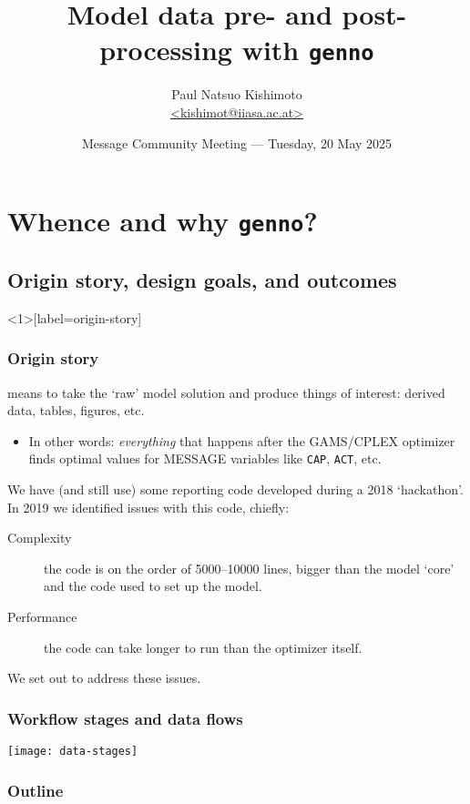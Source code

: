 \documentclass[12pt,aspectratio=169]{beamer}
\title{Model data pre- and post-processing with \texttt{genno}}
\date{
  \texorpdfstring{Message Community Meeting — Tuesday, 20 May 2025}%
  {2025-05-20}}
\author{\texorpdfstring{Paul Natsuo Kishimoto\\
  \href{mailto:kishimot@iiasa.ac.at}{\ttfamily \scriptsize <kishimot@iiasa.ac.at>}%
  }{Paul Natsuo Kishimoto <kishimot@iiasa.ac.at>}}
\begin{document}
\maketitle

\section{Whence and why \texttt{genno}?}

\subsection{Origin story, design goals, and outcomes}

\begin{frame}<1>[label=origin-story]
\frametitle{Origin story}

 means to take the ‘raw’ model solution
and produce things of interest: derived data, tables, figures, etc.
\begin{itemize}
  \item In other words: \emph{everything} that happens after the GAMS/CPLEX optimizer
    finds optimal values for MESSAGE variables like \texttt{CAP}, \texttt{ACT}, etc.
\end{itemize}

\pause
\medskip
We have (and still use) some reporting code developed during a 2018 ‘hackathon’.
In 2019 we identified issues with this code, chiefly:

\begin{description}
  \item [Complexity] the code is on the order of 5000–10000 lines,
    bigger than the model ‘core’ and the code used to set up the model.
  \item [Performance] the code can take longer to run than the optimizer itself.
\end{description}

\medskip
We set out to address these issues.
\end{frame}

\begin{frame}[label=data-stages]
\frametitle{Workflow stages and data flows}

\texttt{[image: data-stages]}

\end{frame}


\begin{frame}
\frametitle{Outline}

\tableofcontents

\end{frame}
\end{document}
